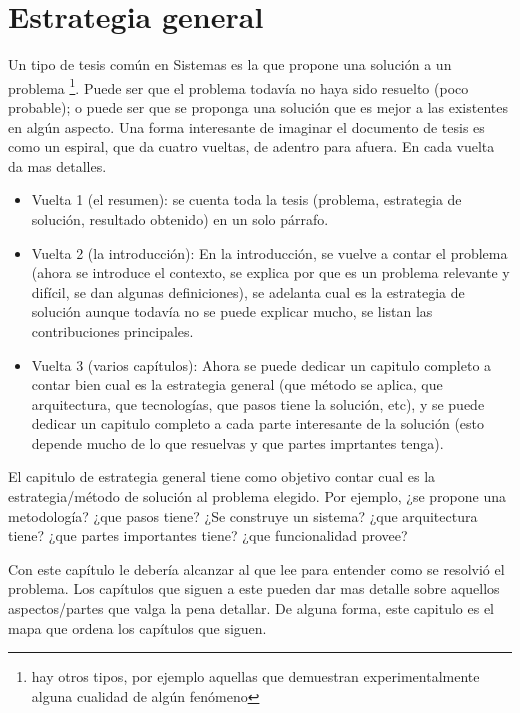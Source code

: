 \chapter{Estrategia general}
\label{estrategia}

Un tipo de tesis común en Sistemas es la que propone una solución a un problema \footnote{hay otros tipos, por ejemplo aquellas que demuestran experimentalmente alguna cualidad de algún fenómeno}. Puede ser que el problema todavía no haya sido resuelto (poco probable); o puede ser que se proponga una solución que es mejor a las existentes en algún aspecto. Una forma interesante de imaginar el documento de tesis es como un espiral, que da cuatro vueltas, de adentro para afuera. En cada vuelta da mas detalles.

\begin{itemize}
\item Vuelta 1 (el resumen): se cuenta toda la tesis (problema, estrategia de solución, resultado obtenido) en un solo párrafo.
\item Vuelta 2 (la introducción): En la introducción, se vuelve a contar el problema (ahora se introduce el contexto, se explica por que es un problema relevante y difícil, se dan algunas definiciones), se adelanta cual es la estrategia de solución aunque todavía no se puede explicar mucho, se listan las contribuciones principales.  
\item Vuelta 3 (varios capítulos): Ahora se puede dedicar un capitulo completo a contar bien cual es la estrategia general (que método se aplica, que arquitectura, que tecnologías, que pasos tiene la solución, etc), y se puede dedicar un capitulo completo a cada parte interesante de la solución (esto depende mucho de lo que resuelvas y que partes imprtantes tenga).
\end{itemize}  

El capitulo de estrategia general tiene como objetivo contar cual es la estrategia/método de solución al problema elegido.  Por ejemplo, ¿se propone una metodología? ¿que pasos tiene? ¿Se construye un sistema? ¿que arquitectura tiene? ¿que partes importantes tiene? ¿que funcionalidad provee?

Con este capítulo le debería alcanzar al que lee para entender como se resolvió el problema. Los capítulos que siguen a este pueden dar mas detalle sobre aquellos aspectos/partes que valga la pena detallar.  De alguna forma, este capitulo es el mapa que ordena los capítulos que siguen. 






